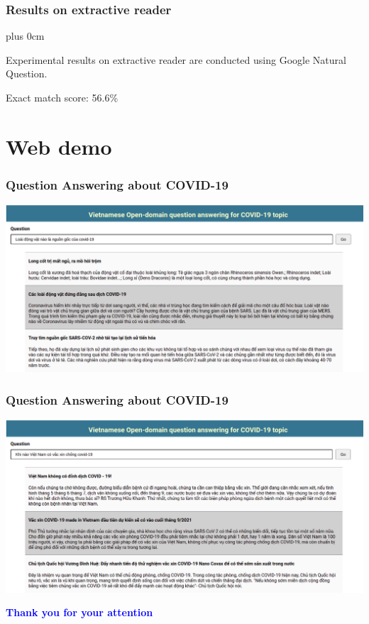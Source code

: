 \documentclass[11pt]{beamer}
\renewcommand{\raggedright}{\leftskip=0pt \rightskip=0pt plus 0cm}
\let\olditemize=\itemize
\renewenvironment{itemize}{\olditemize\raggedright}{\endlist}
\begin{document}
\begin{frame}
\frametitle{Results on extractive reader}
\begin{itemize}
	\item Experimental results on extractive reader are conducted using Google Natural Question.
	\item Exact match score: 56.6\%
\end{itemize}
\end{frame}
\section{Web demo}
\begin{frame}
\frametitle{Question Answering about COVID-19}
\begin{adjustwidth}{-2em}{-2em}
\includegraphics[scale=.27]{images/VNQA.png}
\end{adjustwidth}
\end{frame}
\begin{frame}
\frametitle{Question Answering about COVID-19}
\begin{adjustwidth}{-2em}{-2em}
	\includegraphics[scale=.27]{images/VNQA_2.png}
\end{adjustwidth}
\end{frame}
\begin{frame}[plain]
\begin{center}
\textcolor{blue}{\fontsize{20pt}{\baselineskip}\selectfont\bfseries Thank you for your attention}
\end{center}
\end{frame}
\end{document}
